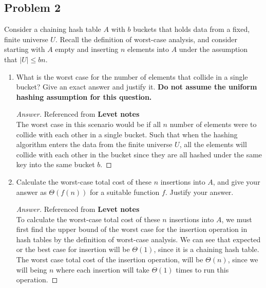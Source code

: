 \documentclass[11pt]{article}
\theoremstyle{definition}
\theoremstyle{definition}
\theoremstyle{definition}
\begin{document}
\newpage
\subsection{Problem 2}
Consider a chaining hash table $A$ with $b$ buckets that holds data from a fixed, finite universe $U$. Recall the definition of worst-case analysis, and consider starting with $A$ empty and inserting $n$ elements into $A$ under the assumption that $|U|\le bn$. 
    
	\begin{enumerate}[label=(\alph*)]
	  \item What is the worst case for the number of elements that collide in a single bucket? Give an exact answer and justify it.     \textbf{Do not assume the uniform hashing assumption for this question.}

    \begin{proof}[Answer] Referenced from \textbf{Levet notes} \\
    The worst case in this scenario would be if all $n$ number of elements were to collide with each other in a single bucket. Such that when the hashing algorithm enters the data from the finite universe $U$, all the elements will collide with each other in the bucket since they are all hashed under the same key into the same bucket $b$.
    \end{proof}

\vfill
	  \item Calculate the worst-case total cost of these $n$ insertions into $A$, and give your answer as $\Theta(f(n))$ for a suitable function $f$. Justify your answer.

    \begin{proof}[Answer] Referenced from \textbf{Levet notes}\\
      To calculate the worst-case total cost of these $n$ insertions into $A$, we must first find the upper bound of the worst case for the insertion operation in hash tables by the definition of worst-case analysis. We can see that expected or the best case for insertion will be $\Theta(1)$, since it is a chaining hash table. The worst case total cost of the insertion operation, will be $\Theta(n)$, since we will being $n$ where each insertion will take $\Theta(1)$ times to run this operation.
    \end{proof}
    
    \vfill
	

\end{enumerate}
\end{document}
